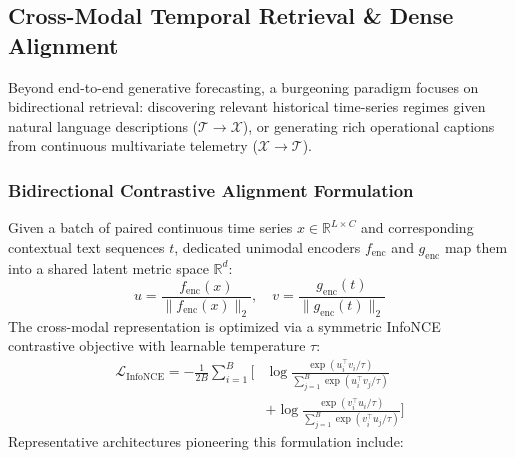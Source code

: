 \subsection{Cross-Modal Temporal Retrieval \& Dense Alignment}
\label{sec:retrieval_alignment}
Beyond end-to-end generative forecasting, a burgeoning paradigm focuses on bidirectional retrieval: discovering relevant historical time-series regimes given natural language descriptions ($\mathcal{T} \to \mathcal{X}$), or generating rich operational captions from continuous multivariate telemetry ($\mathcal{X} \to \mathcal{T}$).

\subsubsection{Bidirectional Contrastive Alignment Formulation}
Given a batch of paired continuous time series $x \in \mathbb{R}^{L \times C}$ and corresponding contextual text sequences $t$, dedicated unimodal encoders $f_{\text{enc}}$ and $g_{\text{enc}}$ map them into a shared latent metric space $\mathbb{R}^d$:
\begin{equation}
    u = \frac{f_{\text{enc}}(x)}{\|f_{\text{enc}}(x)\|_2}, \quad v = \frac{g_{\text{enc}}(t)}{\|g_{\text{enc}}(t)\|_2}
\end{equation}
The cross-modal representation is optimized via a symmetric InfoNCE contrastive objective with learnable temperature $\tau$:
\begin{equation}
\begin{aligned}
    \mathcal{L}_{\text{InfoNCE}} = -\frac{1}{2B} \sum_{i=1}^B \Bigg[ &\log \frac{\exp(u_i^\top v_i / \tau)}{\sum_{j=1}^B \exp(u_i^\top v_j / \tau)} \\
    &+ \log \frac{\exp(v_i^\top u_i / \tau)}{\sum_{j=1}^B \exp(v_i^\top u_j / \tau)} \Bigg]
\end{aligned}
\label{eq:infonce_retrieval}
\end{equation}
Representative architectures pioneering this formulation include:
